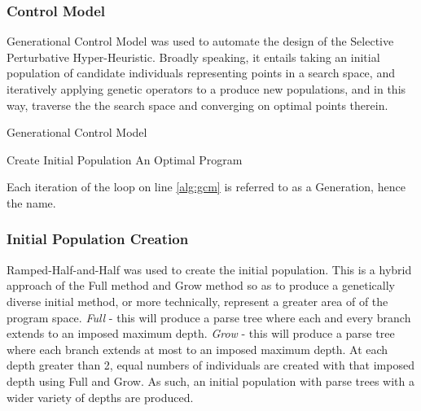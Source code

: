 \documentclass[a4paper,12pt]{article}
\begin{document}
        \subsubsection*{Control Model} \label{subsubsec:controlmodel}
            \par{
                \noindent 
                Generational Control Model was used to automate the design of the Selective Perturbative Hyper-Heuristic. Broadly speaking, 
                it entails taking an initial population of candidate individuals representing points in a search space, and iteratively applying 
                genetic operators to a produce new populations, and in this way, traverse the the search space and converging on optimal points therein.  
                \newline     
                \begin{algorithm}[H]
                    \caption{Generational Control Model}
                    \SetAlgoLined
                    Create Initial Population\;
                    \Return An Optimal Program \; 
                   
                    
                \end{algorithm}
                \noindent Each iteration of the loop on line \ref{alg:gcm} is referred to as a Generation, hence the name. 
            }
        \subsubsection*{Initial Population Creation}
            \par{
                \noindent 
                Ramped-Half-and-Half was used to create the initial population. This is a hybrid approach of the Full method and Grow method so as to produce 
                a genetically diverse initial method, or more technically, represent a greater area of of the program space.\newline 
                \newline 
                \textit{Full} - this will produce a parse tree where each and every branch extends to an imposed maximum depth.\newline  
                \textit{Grow} - this will produce a parse tree where each branch extends at most to an imposed maximum depth. \newline 
                \newline 
                At each depth greater than 2, equal numbers of individuals are created with that imposed depth using Full and Grow. As such, an initial population with 
                parse trees with a wider variety of depths are produced. 
            }
        \newpage
\end{document}
